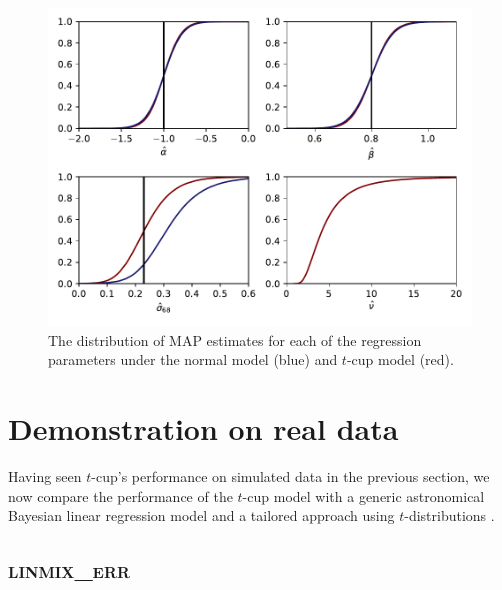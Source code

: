 \documentclass[fleqn,usenatbib]{rasti}
\begin{document}
\begin{figure}
    \includegraphics[width=\columnwidth]{graphics/fixed/laplace_cdf.pdf}
    \caption{The distribution of MAP estimates for each
    of the regression parameters under the normal model (blue) and $t$-cup model
    (red).}
    \label{fig:results.laplace.map}
\end{figure}


\section{Demonstration on real data}
\label{sec:real-world}


Having seen $t$-cup's performance on simulated data in the previous section, we
now compare the performance of the $t$-cup model with a generic astronomical
Bayesian linear regression model \citep[\textsc{linmix\_err};][]{Kelly:2007} and
a tailored approach using $t$-distributions \citep{Park:2017}.

\subsection{\textsc{linmix\_err}}
\end{document}
